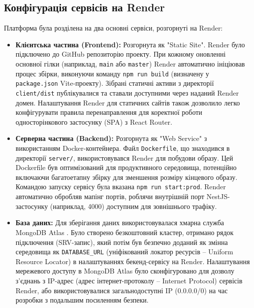 \subsection{Конфігурація сервісів на Render}
Платформа була розділена на два основні сервіси, розгорнуті на Render:
\begin{itemize}
    \item \textbf{Клієнтська частина (Frontend):} Розгорнута як "Static Site". Render було підключено до GitHub репозиторію проекту. При кожному оновленні основної гілки (наприклад, \texttt{main} або \texttt{master}) Render автоматично ініціював процес збірки, виконуючи команду \texttt{npm run build} (визначену у \texttt{package.json} Vite-проекту). Зібрані статичні активи з директорії \texttt{client/dist} публікувалися та ставали доступними через наданий Render домен. Налаштування Render для статичних сайтів також дозволило легко конфігурувати правила перенаправлення для коректної роботи односторінкового застосунку (SPA) з React Router.
    \item \textbf{Серверна частина (Backend):} Розгорнута як "Web Service" з використанням Docker-контейнера. Файл \texttt{Dockerfile}, що знаходився в директорії \texttt{server/}, використовувався Render для побудови образу. Цей Dockerfile був оптимізований для продуктивного середовища, потенційно включаючи багатоетапну збірку для зменшення розміру кінцевого образу. Командою запуску сервісу була вказана \texttt{npm run start:prod}. Render автоматично обробляв мапінг портів, роблячи внутрішній порт NestJS-застосунку (наприклад, 4000) доступним для зовнішнього трафіку.
    \item \textbf{База даних:} Для зберігання даних використовувалася хмарна служба MongoDB Atlas \cite{mongodb}. Було створено безкоштовний кластер, отримано рядок підключення (SRV-запис), який потім був безпечно доданий як змінна середовища як \texttt{DATABASE\_URL} (уніфікований локатор ресурсів – Uniform Resource Locator) в налаштуваннях бекенд-сервісу на Render. Налаштування мережевого доступу в MongoDB Atlas було сконфігуровано для дозволу з'єднань з IP-адрес (адрес інтернет-протоколу – Internet Protocol) сервісів Render, або використовувалися загальнодоступні IP (0.0.0.0/0) на час розробки з подальшим посиленням безпеки.
\end{itemize}

